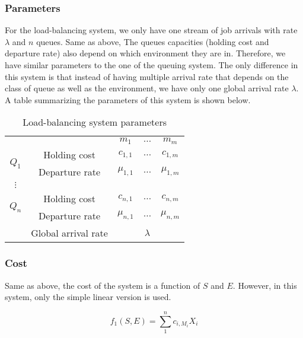 \documentclass[
  a4paper, xcolor = usenames,dvipsnames]{article}
\theoremstyle{definition}
\theoremstyle{definition}
\theoremstyle{definition}
\theoremstyle{definition}
\theoremstyle{remark}
\begin{document}
\hypertarget{parameters-1}{%
\subsubsection{Parameters}\label{parameters-1}}

For the load-balancing system, we only have one stream of job arrivals with rate \(\lambda\) and \(n\) queues. Same as above, The queues capacities (holding cost and departure rate) also depend on which environment they are in. Therefore, we have similar parameters to the one of the queuing system. The only difference in this system is that instead of having multiple arrival rate that depends on the class of queue as well as the environment, we have only one global arrival rate \(\lambda\). A table summarizing the parameters of this system is shown below.

\begin{table}[!htbp]
\caption{Load-balancing system parameters}
\begin{center}
\begin{tabular}{c c c c c}
    \hline
    \multicolumn{2}{c}{} & $m_{1}$ & $\dots$ & $m_{m}$ \\
    \cline{2-5}
    \multirow{2}{*}{$Q_{1}$} &  Holding cost & $c_{1, 1}$ & $\dots$ & $c_{1, m}$ \\
    & Departure rate & $\mu_{1, 1}$ & $\dots$ & $\mu_{1, m}$ \\
    \cline{2-5}
    $\vdots$  \\
    \cline{2-5}
    \multirow{2}{*}{$Q_{n}$} &  Holding cost & $c_{n, 1}$ & $\dots$ & $c_{n, m}$ \\
    & Departure rate & $\mu_{n, 1}$ & $\dots$ & $\mu_{n, m}$ \\
    \cline{2-5}
    & Global arrival rate & & $\lambda$ & \\
    \hline
\end{tabular}
\end{center}
\label{tab:lbs-param}
\end{table}

\hypertarget{cost-1}{%
\subsubsection{Cost}\label{cost-1}}

Same as above, the cost of the system is a function of \(S\) and \(E\). However, in this system, only the simple linear version is used.

\[
f_{1}(S, E) = \sum_{1}^{n} c_{i, M_{i}} X_{i}
\]
\end{document}
